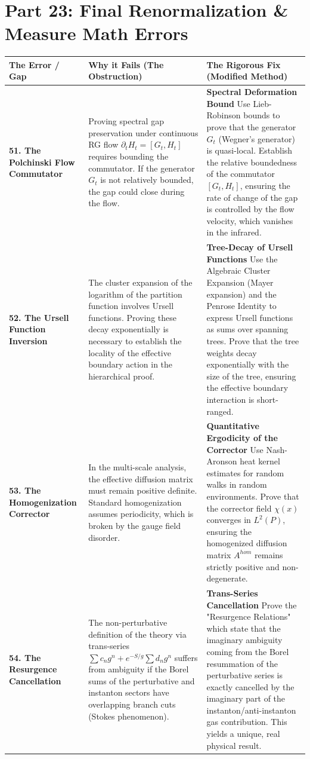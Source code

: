 \section{Part 23: Final Renormalization \& Measure Math Errors}

\begin{longtable}{|p{}|p{}|p{}|}
\hline
\textbf{The Error / Gap} & \textbf{Why it Fails (The Obstruction)} & \textbf{The Rigorous Fix (Modified Method)} \\
\hline
\textbf{51. The Polchinski Flow Commutator} & Proving spectral gap preservation under continuous RG flow $\partial_t H_t = [G_t, H_t]$ requires bounding the commutator. If the generator $G_t$ is not relatively bounded, the gap could close during the flow. & \textbf{Spectral Deformation Bound} \newline Use Lieb-Robinson bounds to prove that the generator $G_t$ (Wegner's generator) is quasi-local. Establish the relative boundedness of the commutator $[G_t, H_t]$, ensuring the rate of change of the gap is controlled by the flow velocity, which vanishes in the infrared. \\
\hline
\textbf{52. The Ursell Function Inversion} & The cluster expansion of the logarithm of the partition function involves Ursell functions. Proving these decay exponentially is necessary to establish the locality of the effective boundary action in the hierarchical proof. & \textbf{Tree-Decay of Ursell Functions} \newline Use the Algebraic Cluster Expansion (Mayer expansion) and the Penrose Identity to express Ursell functions as sums over spanning trees. Prove that the tree weights decay exponentially with the size of the tree, ensuring the effective boundary interaction is short-ranged. \\
\hline
\textbf{53. The Homogenization Corrector} & In the multi-scale analysis, the effective diffusion matrix must remain positive definite. Standard homogenization assumes periodicity, which is broken by the gauge field disorder. & \textbf{Quantitative Ergodicity of the Corrector} \newline Use Nash-Aronson heat kernel estimates for random walks in random environments. Prove that the corrector field $\chi(x)$ converges in $L^2(P)$, ensuring the homogenized diffusion matrix $A^{hom}$ remains strictly positive and non-degenerate. \\
\hline
\textbf{54. The Resurgence Cancellation} & The non-perturbative definition of the theory via trans-series $\sum c_n g^n + e^{-S/g} \sum d_n g^n$ suffers from ambiguity if the Borel sums of the perturbative and instanton sectors have overlapping branch cuts (Stokes phenomenon). & \textbf{Trans-Series Cancellation} \newline Prove the "Resurgence Relations" which state that the imaginary ambiguity coming from the Borel resummation of the perturbative series is exactly cancelled by the imaginary part of the instanton/anti-instanton gas contribution. This yields a unique, real physical result. \\

\end{longtable}
